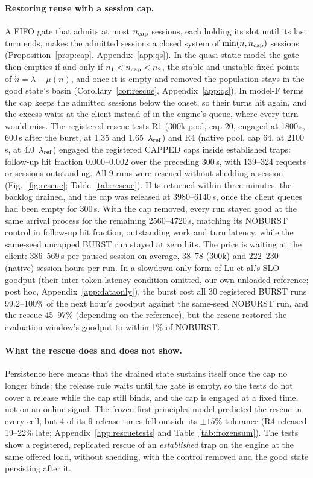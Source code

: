 \paragraph{Restoring reuse with a session cap.} A FIFO gate that admits at most $n_{\mathrm{cap}}$ sessions, each holding its slot until its
last turn ends, makes the admitted sessions a closed system of $\min(n,n_{\mathrm{cap}})$ sessions (Proposition~\ref{prop:cap}, Appendix~\ref{app:qs}). In the
quasi-static model the gate then empties if and only if $n_1<n_{\mathrm{cap}}<n_2$, the stable and unstable fixed points of
$\dot n=\lambda-\mu(n)$, and once it is empty and removed the population stays in the good state's basin
(Corollary~\ref{cor:rescue}, Appendix~\ref{app:qs}). In model-F terms the cap keeps the admitted sessions below the onset, so their turns hit again, and the
excess waits at the client instead of in the engine's queue, where every turn would miss. The registered rescue tests R1 (300k pool,
cap 20, engaged at 1800\,s, 600\,s after the burst, at 1.35 and 1.65~$\lambda_{\mathrm{ref}}$) and R4 (native pool, cap 64, at 2100\,s, at
4.0~$\lambda_{\mathrm{ref}}$) engaged the registered CAPPED caps inside established traps: follow-up hit fraction 0.000--0.002 over the preceding
300\,s, with 139--324 requests or sessions outstanding. All 9 runs were rescued without shedding a session (Fig.~\ref{fig:rescue};
Table~\ref{tab:rescue}). Hits returned within three minutes, the backlog drained, and the cap was released at 3980--6140\,s, once the
client queues had been empty for 300\,s. With the cap removed, every run stayed good at the same arrival process for the remaining
2560--4720\,s, matching its NOBURST control in follow-up hit fraction, outstanding work and turn latency, while the same-seed uncapped
BURST run stayed at zero hits. The price is waiting at the client: 386--569\,s per paused session on average, 38--78 (300k) and 222--230
(native) session-hours per run. In a slowdown-only form of Lu et al.'s SLO goodput (their
inter-token-latency condition omitted, our own unloaded reference; post hoc, Appendix~\ref{app:dataonly}), the burst cost all 30
registered BURST runs 99.2--100\% of the next hour's goodput against the same-seed NOBURST run, and the rescue 45--97\% (depending
on the reference), but the rescue restored the evaluation window's goodput to within 1\% of NOBURST.

\paragraph{What the rescue does and does not show.} Persistence here means that the drained state sustains itself once the cap no
longer binds: the release rule waits until the gate is empty, so the tests do not cover a release while the cap still binds, and
the cap is engaged at a fixed time, not on an online signal. The frozen first-principles model predicted the rescue in every cell,
but 4 of its 9 release times fell outside its $\pm15$\% tolerance (R4 released 19--22\% late; Appendix~\ref{app:rescuetests} and Table~\ref{tab:frozensum}). The tests show a registered, replicated rescue of an \emph{established} trap on
the engine at the same offered load, without shedding, with the control removed and the good state persisting after it.
